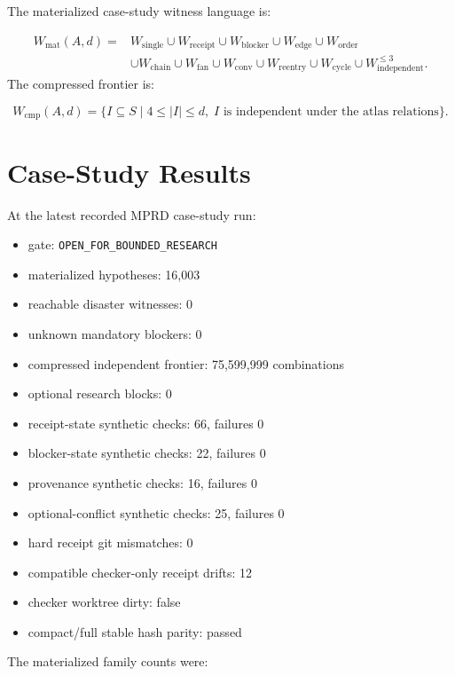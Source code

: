 \documentclass[11pt]{article}
\begin{document}
The materialized case-study witness language is:

\[
\begin{aligned}
W_{\mathrm{mat}}(A,d)=&
W_{\mathrm{single}}\cup W_{\mathrm{receipt}}\cup W_{\mathrm{blocker}}
\cup W_{\mathrm{edge}}\cup W_{\mathrm{order}}\\
&\cup W_{\mathrm{chain}}\cup W_{\mathrm{fan}}\cup W_{\mathrm{conv}}
\cup W_{\mathrm{reentry}}\cup W_{\mathrm{cycle}}
\cup W_{\mathrm{independent}}^{\le 3}.
\end{aligned}
\]
The compressed frontier is:

\[
W_{\mathrm{cmp}}(A,d)=
\{I\subseteq S\mid 4\le |I|\le d,\; I
\text{ is independent under the atlas relations}\}.
\]
\section{Case-Study Results}
At the latest recorded MPRD case-study run:

\begin{itemize}
\item gate: \texttt{OPEN\_FOR\_BOUNDED\_RESEARCH}
\item materialized hypotheses: 16,003
\item reachable disaster witnesses: 0
\item unknown mandatory blockers: 0
\item compressed independent frontier: 75,599,999 combinations
\item optional research blocks: 0
\item receipt-state synthetic checks: 66, failures 0
\item blocker-state synthetic checks: 22, failures 0
\item provenance synthetic checks: 16, failures 0
\item optional-conflict synthetic checks: 25, failures 0
\item hard receipt git mismatches: 0
\item compatible checker-only receipt drifts: 12
\item checker worktree dirty: false
\item compact/full stable hash parity: passed
\end{itemize}
The materialized family counts were:
\end{document}

